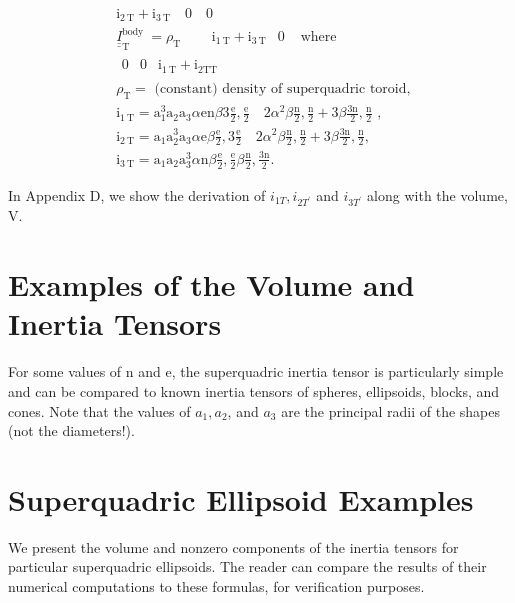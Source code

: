$$
\begin{aligned}
& \mathrm{i}_{2 \mathrm{~T}}+\mathrm{i}_{3 \mathrm{~T}} \quad 0 \quad 0 \\
& \underline{\underline{I}}_{\mathrm{T}}^{\text {body }}=\rho_{\mathrm{T}} \quad \begin{array}{lllll} & \mathrm{i}_{1 \mathrm{~T}}+\mathrm{i}_{3 \mathrm{~T}} & 0 & \text { where }\end{array} \\
& \begin{array}{lll}0 & 0 & \mathrm{i}_{1 \mathrm{~T}}+\mathrm{i}_{2 \mathrm{TT}}\end{array} \\
& \rho_{\mathrm{T}}=\text { (constant) density of superquadric toroid, } \\
& \mathrm{i}_{1 \mathrm{~T}}=\mathrm{a}_{1}^{3} \mathrm{a}_{2} \mathrm{a}_{3} \alpha \mathrm{en} \beta 3 \frac{\mathrm{e}}{2}, \frac{\mathrm{e}}{2} \quad 2 \alpha^{2} \beta \frac{\mathrm{n}}{2}, \frac{\mathrm{n}}{2}+3 \beta \frac{3 \mathrm{n}}{2}, \frac{\mathrm{n}}{2} \text { , } \\
& \mathrm{i}_{2 \mathrm{~T}}=\mathrm{a}_{1} \mathrm{a}_{2}^{3} \mathrm{a}_{3} \alpha \mathrm{e} \beta \frac{\mathrm{e}}{2}, 3 \frac{\mathrm{e}}{2} \quad 2 \alpha^{2} \beta \frac{\mathrm{n}}{2}, \frac{\mathrm{n}}{2}+3 \beta \frac{3 \mathrm{n}}{2}, \frac{\mathrm{n}}{2} \text {, } \\
& \mathrm{i}_{3 \mathrm{~T}}=\mathrm{a}_{1} \mathrm{a}_{2} \mathrm{a}_{3}^{3} \alpha \mathrm{n} \beta \frac{\mathrm{e}}{2}, \frac{\mathrm{e}}{2} \beta \frac{\mathrm{n}}{2}, \frac{3 \mathrm{n}}{2} \text {. }
\end{aligned}
$$

In Appendix D, we show the derivation of $i_{1 T}, i_{2 T^{\prime}}$ and $i_{3 T^{\prime}}$ along with the volume, V.

\section{Examples of the Volume and Inertia Tensors}
For some values of $\mathrm{n}$ and e, the superquadric inertia tensor is particularly simple and can be compared to known inertia tensors of spheres, ellipsoids, blocks, and cones. Note that the values of $a_{1}, a_{2}$, and $a_{3}$ are the principal radii of the shapes (not the diameters!).

\section{Superquadric Ellipsoid Examples}
We present the volume and nonzero components of the inertia tensors for particular superquadric ellipsoids. The reader can compare the results of their numerical computations to these formulas, for verification purposes.

